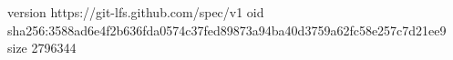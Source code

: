version https://git-lfs.github.com/spec/v1
oid sha256:3588ad6e4f2b636fda0574c37fed89873a94ba40d3759a62fc58e257c7d21ee9
size 2796344
